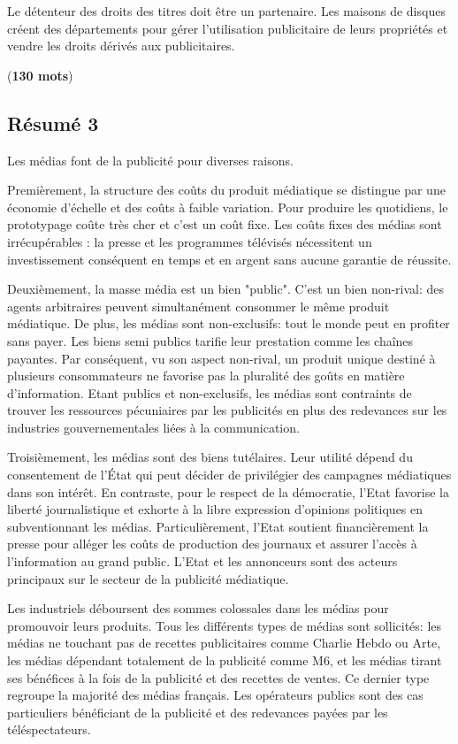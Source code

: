 \documentclass[11pt]{article}
\begin{document}
Le détenteur des droits des titres doit être un partenaire. Les maisons de disques créent des départements pour gérer l'utilisation publicitaire de leurs propriétés et vendre les droits dérivés aux publicitaires.

(\textbf{130 mots})

\newpage
\subsection{Résumé 3}

Les médias font de la publicité pour diverses raisons.

Premièrement, la structure des coûts du produit médiatique se distingue par une économie d'échelle et des coûts à faible variation. Pour produire les quotidiens, le prototypage coûte très cher et c'est un coût fixe. Les coûts fixes des médias sont irrécupérables : la presse et les programmes télévisés nécessitent un investissement conséquent en temps et en argent sans aucune garantie de réussite.

Deuxièmement, la masse média est un bien "public". C'est un bien non-rival: des agents arbitraires peuvent simultanément consommer le même produit médiatique. De plus, les médias sont non-exclusifs: tout le monde peut en profiter sans payer. Les biens semi publics tarifie leur prestation comme les chaînes payantes.
Par conséquent, vu son aspect non-rival, un produit unique destiné à plusieurs consommateurs ne favorise pas la pluralité des goûts en matière d'information. Etant publics et non-exclusifs, les médias sont contraints de trouver les ressources pécuniaires par les publicités en plus des redevances sur les industries gouvernementales liées à la communication.

Troisièmement, les médias sont des biens tutélaires. Leur utilité dépend du consentement de l’État qui peut décider de privilégier des campagnes médiatiques dans son intérêt. En contraste, pour le respect de la démocratie, l'Etat favorise la liberté journalistique et exhorte à la libre expression d'opinions politiques en subventionnant les médias. Particulièrement, l'Etat soutient financièrement la presse  pour alléger les coûts de production des journaux et assurer l'accès à l'information au grand public.
L'Etat et les annonceurs sont des acteurs principaux sur le secteur de la publicité médiatique.

Les industriels déboursent des sommes colossales dans les médias pour promouvoir leurs produits. Tous les différents types de médias sont sollicités: les médias ne touchant pas de recettes publicitaires comme Charlie Hebdo ou Arte, les médias dépendant totalement de la publicité comme M6, et les médias tirant ses bénéfices à la fois de la publicité et des recettes de ventes. Ce dernier type regroupe la majorité des médias français. Les opérateurs publics sont des cas particuliers bénéficiant de la publicité et des redevances payées par les téléspectateurs.
\end{document}

